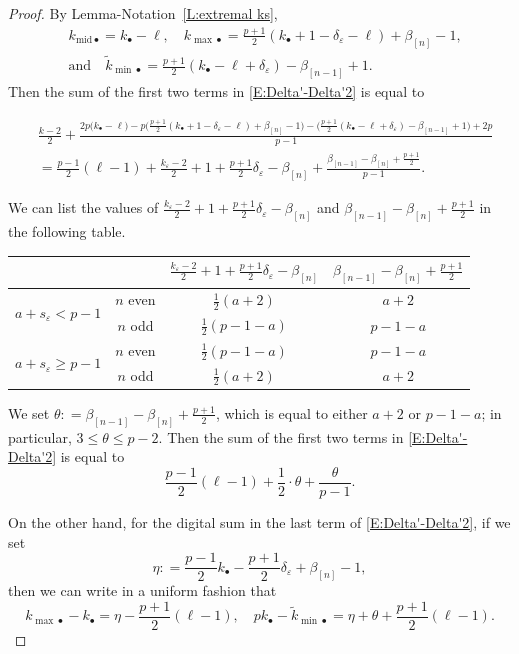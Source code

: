 \documentclass[12pt]{amsart}
\theoremstyle{definition}
\numberwithin{equation}{subsection}
\newcommand{\midd}{\mathrm{mid}}
\begin{document}
\begin{proof}
By Lemma-Notation~\ref{L:extremal ks}, 
\begin{align*}
&k_{\midd \bullet} =k_{\bullet} -\ell, \quad k_{{\max}\bullet} =\tfrac {p+1}2 (k_{\bullet}+1-\delta_\varepsilon -\ell) + \beta_{[n]}-1,
\\
& \textrm{and} \quad \tilde k_{{\min}\bullet}  =  \tfrac{p+1}2 (k_{\bullet}-\ell+\delta_\varepsilon) - \beta_{[n-1]}+1.
\end{align*}
Then the sum of the first two terms in \eqref{E:Delta'-Delta'2} is equal to
\begin{small}
\begin{align*}
&\frac{k-2}2 +
\frac{2 p\big( k_\bullet -\ell\big)  -p \big(\tfrac{p+1}2(k_\bullet+1 - \delta_\varepsilon -\ell) + \beta_{[n]}-1\big) 
- \big(\tfrac{p+1}2(k_\bullet - \ell+ \delta_\varepsilon) - \beta_{[n-1]}+1 \big)+2p}{p-1}
\\
&= \frac{p-1}2 (\ell-1)+ \frac{k_\varepsilon - 2}2+1+\frac{p+1}2 \delta_\varepsilon -\beta_{[n]}+ \frac{\beta_{[n-1]}-\beta_{[n]}+\frac{p+1}2}{p-1}.
\end{align*}\end{small}We can list the values of $\frac{k_\varepsilon - 2}2+1+\frac{p+1}2 \delta_\varepsilon -\beta_{[n]}$ and $\beta_{[n-1]}-\beta_{[n]}+\frac{p+1}2$ in the following table.
\begin{center}
\begin{tabular}{|c|c|c|c|}
\hline
& &$\frac{k_\varepsilon - 2}2+1+\frac{p+1}2 \delta_\varepsilon -\beta_{[n]}$ & $\beta_{[n-1]}-\beta_{[n]}+\frac{p+1}2$
\\
\hline
\multirow{2}{*}{$a+s_\varepsilon < p-1$} & $n$ even & $\frac 12(a+2)$ & $a+2$
\\
\cline{2-4}
& $n$ odd & $\frac 12(p-1-a)$ & $p-1-a$
\\
\hline 
\multirow{2}{*}{
$a+s_\varepsilon \geq p-1$} & $n$ even & $\frac 12(p-1-a)$ & $p-1-a$
\\
\cline{2-4} & $n$ odd & $\frac 12(a+2)$ & $a+2$
\\
\hline
\end{tabular}
\end{center}
We set $\theta: = \beta_{[n-1]}-\beta_{[n]}+\frac{p+1}2$, which is equal to either $a+2$ or $p-1-a$; in particular, $3\leq \theta \leq p-2$. Then the sum of the first two terms in \eqref{E:Delta'-Delta'2} is equal to
$$
\frac{p-1}2(\ell-1) + \frac 12\cdot  \theta + \frac{\theta}{p-1}.
$$


On the other hand, 
for the digital sum in the last term of \eqref{E:Delta'-Delta'2}, if we set
\begin{equation}
\label{E:eta}
\eta: = \frac{p-1}2k_\bullet -\frac{p+1}2\delta_\varepsilon + \beta_{[n]}-1,
\end{equation}
then we can write in a uniform fashion that
\begin{equation}
\label{E:kmax - k}
k_{{\max}\bullet}-k_\bullet = \eta - \frac{p+1}2 (\ell-1) , \quad pk_\bullet -\tilde k_{{\min}\bullet} =\eta+\theta +\frac{p+1}2(\ell-1).
\end{equation}


\end{proof}
\end{document}
